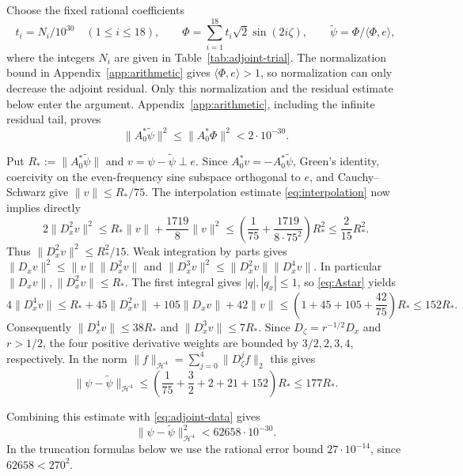 \documentclass[a4paper,11pt]{article}
\numberwithin{equation}{section}
\theoremstyle{definition}
\theoremstyle{remark}
\newcommand{\norm}[1]{\lVert#1\rVert}
\newcommand{\ip}[2]{\langle#1,#2\rangle}
\begin{document}
Choose the fixed rational coefficients
\begin{equation}\label{eq:adjoint-trial}
 t_i=N_i/10^{30}\quad(1\le i\le18),\qquad
 \Phi=\sum_{i=1}^{18}t_i\sqrt2\sin(2i\zeta),\qquad
 \widetilde\psi=\Phi/\ip\Phi e,
\end{equation}
where the integers $N_i$ are given in Table~\ref{tab:adjoint-trial}.
The normalization bound in Appendix~\ref{app:arithmetic} gives
$\ip\Phi e>1$, so normalization can only decrease the adjoint residual.
Only this normalization and the residual estimate below enter the argument.
Appendix~\ref{app:arithmetic}, including the infinite residual tail, proves
\begin{equation}\label{eq:adjoint-data}
 \norm{A_0^*\widetilde\psi}^2\le\norm{A_0^*\Phi}^2<2\cdot10^{-30}.
\end{equation}


Put $R_*:=\norm{A_0^*\widetilde\psi}$ and $v=\psi-\widetilde\psi\perp e$. Since
$A_0^*v=-A_0^*\widetilde\psi$, Green's identity, coercivity on the even-frequency sine subspace orthogonal to $e$,
and Cauchy--Schwarz give $\norm v\le R_*/75$.
The interpolation estimate \eqref{eq:interpolation} now implies directly
\[
 2\norm{D_x^2v}^2
 \le R_*\norm v+\frac{1719}{8}\norm v^2
 \le\left(\frac1{75}+\frac{1719}{8\cdot75^2}\right)R_*^2
 \le\frac{2}{15}R_*^2.
\]
Thus $\norm{D_x^2v}^2\le R_*^2/15$.
Weak integration by parts gives
$\norm{D_xv}^2\le\norm v\norm{D_x^2v}$ and
$\norm{D_x^3v}^2\le\norm{D_x^2v}\norm{D_x^4v}$.
In particular $\norm{D_xv},\norm{D_x^2v}\le R_*$.
The first integral gives $|q|,|q_x|\le1$, so \eqref{eq:Astar} yields
\[
 4\norm{D_x^4v}
 \le R_*+45\norm{D_x^2v}+105\norm{D_xv}+42\norm v
 \le\left(1+45+105+\frac{42}{75}\right)R_*\le152R_*.
\]
Consequently $\norm{D_x^4v}\le38R_*$ and
$\norm{D_x^3v}\le7R_*$.
Since $D_\zeta=r^{-1/2}D_x$ and $r>1/2$, the four positive derivative
weights are bounded by $3/2,2,3,4$, respectively. In the norm
$\norm f_{\mathcal H^4}=\sum_{j=0}^4\norm{D_\zeta^jf}_2$ this gives
\begin{equation}\label{eq:adjoint-H4}
 \norm{\psi-\widetilde\psi}_{\mathcal H^4}
 \le\left(\frac1{75}+\frac32+2+21+152\right)R_*
 \le177R_*.
\end{equation}

Combining this estimate with \eqref{eq:adjoint-data} gives
\begin{equation}\label{eq:fixed-adjoint-error}
 \norm{\psi-\widetilde\psi}_{\mathcal H^4}^2<62658\cdot10^{-30}.
\end{equation}
In the truncation formulas below we use the rational error bound
$27\cdot10^{-14}$, since $62658<270^2$.
\end{document}
